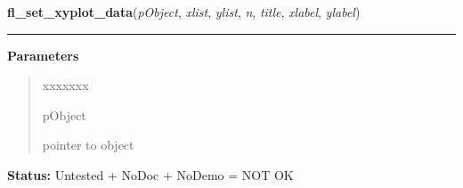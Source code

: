     \label{xformslib:library:fl_set_xyplot_data}

    \vspace{0.5ex}

\hspace{.8\funcindent}\begin{boxedminipage}{\funcwidth}

    \raggedright \textbf{fl\_set\_xyplot\_data}(\textit{pObject}, \textit{xlist}, \textit{ylist}, \textit{n}, \textit{title}, \textit{xlabel}, \textit{ylabel})

    \vspace{-1.5ex}

    \rule{\textwidth}{0.5\fboxrule}
\setlength{\parskip}{2ex}
\setlength{\parskip}{1ex}
      \textbf{Parameters}
      \vspace{-1ex}

      \begin{quote}
        \begin{Ventry}{xxxxxxx}

          \item[pObject]

          pointer to object

        \end{Ventry}

      \end{quote}

\textbf{Status:} Untested + NoDoc + NoDemo = NOT OK



    \end{boxedminipage}

    \label{xformslib:library:fl_set_xyplot_data_double}

    \vspace{0.5ex}

